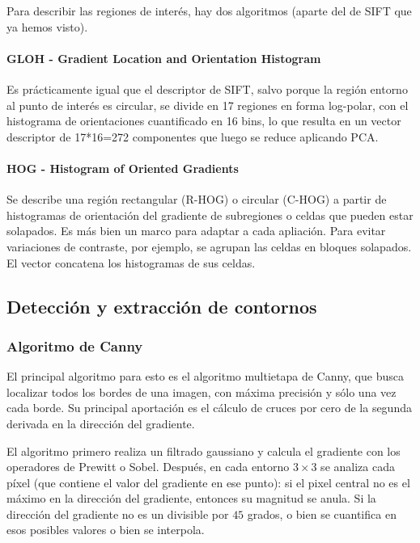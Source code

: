 \documentclass[nochap,palatino]{apuntes}
\begin{document}
Para describir las regiones de interés, hay dos algoritmos (aparte del de SIFT que ya hemos visto).

\paragraph{GLOH - Gradient Location and Orientation Histogram} Es prácticamente igual que el descriptor de SIFT, salvo porque la región entorno al punto de interés es circular, se divide en 17 regiones en forma log-polar, con el histograma de orientaciones cuantificado en 16 bins, lo que resulta en un vector descriptor de 17*16=272 componentes que luego se reduce aplicando PCA.

\paragraph{HOG - Histogram of Oriented Gradients}  Se describe una región rectangular (R-HOG) o circular (C-HOG) a partir de histogramas de orientación del gradiente de subregiones o celdas que pueden estar solapados. Es más bien un marco para adaptar a cada apliación. Para evitar variaciones de contraste, por ejemplo, se agrupan las celdas en bloques solapados. El vector concatena los histogramas de sus celdas.

\subsection{Detección y extracción de contornos}

\subsubsection{Algoritmo de Canny}

El principal algoritmo para esto es el algoritmo multietapa de Canny, que busca localizar todos los bordes de una imagen, con máxima precisión y sólo una vez cada borde. Su principal aportación es el cálculo de cruces por cero de la segunda derivada en la dirección del gradiente.

El algoritmo primero realiza un filtrado gaussiano y calcula el gradiente con los operadores de Prewitt o Sobel. Después, en cada entorno $3×3$ se analiza cada píxel (que contiene el valor del gradiente en ese punto): si el pixel central no es el máximo en la dirección del gradiente, entonces su magnitud se anula. Si la dirección del gradiente no es un divisible por $45$ grados, o bien se cuantifica en esos posibles valores o bien se interpola.
\end{document}
